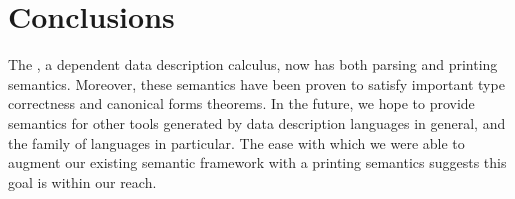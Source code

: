 \section{Conclusions}
\label{sec:conc}






The \ddc{}, a dependent data description calculus, now has both
parsing and printing semantics.  Moreover, these semantics have been
proven to satisfy important type correctness and canonical forms
theorems.  In the future, we hope to provide semantics for other
tools generated by data description languages in general, and
the \pads{} family of languages in particular.  The ease with which 
we were able to augment our existing semantic framework with a printing
semantics suggests this goal is within our reach.
